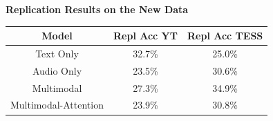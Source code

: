 \documentclass{beamer}
\begin{document}
\begin{frame}
\textbf{Replication Results on the New Data}    
            \begin{center}
                \begin{tabular}{||c c c||} 
                 \hline
                 Model  & Repl Acc YT   & Repl Acc TESS \\ [0.2ex] 
                 \hline\hline
                 Text Only & 32.7\% & 25.0\% \\ 
                 \hline
                 Audio Only &   23.5\% & 30.6\% \\
                 \hline
                 Multimodal & 27.3\%  & 34.9\%\\
                 \hline
                 Multimodal-Attention & 23.9\%  & 30.8\%\\
                 \hline
                \end{tabular}            
            \end{center}

\end{frame}

\end{document}
